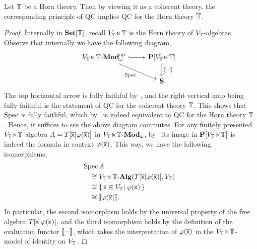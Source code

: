 \begin{theorem}\label{thm:qccohgeneraliseqchorn}
  Let $\mathbb{T}$ be a Horn theory. Then by viewing it as a coherent theory, the corresponding principle of \gls{QC} implies \gls{QC} for the Horn theory $\mathbb{T}$.
\end{theorem}
\begin{proof}
  Internally in $\mathbf{Set}[\mathbb{T}]$, recall $V_{\mathbb{T}}\hspace{-.4ex}\ltimes\hspace{-.4ex}\mathbb{T}$ is the Horn theory of $V_{\mathbb{T}}$-algebras. Observe that internally we have the following diagram,
  \[
  \begin{tikzcd}
    \mmod{\VT}_\omega\op \ar[dr, "\spec"'] \ar[r, hook] & \mb P[\VT] \ar[d, hook, "\ass-"] \\
    & \mb S
  \end{tikzcd}
  \]
  The top horizontal arrow is fully faithful by~, and the right vertical map being fully faithful is the statement of \gls{QC} for the coherent theory $\mathbb{T}$. This shows that $\operatorname{Spec}$ is fully faithful, which by~ is indeed equivalent to \gls{QC} for the Horn theory $\mathbb{T}$. Hence, it suffices to see the above diagram commutes. For any finitely presented $V_{\mathbb{T}}\hspace{-.4ex}\ltimes\hspace{-.4ex}\mathbb{T}$-algebra $A = T[\overline{\mathsf{x}}|\varphi(\overline{\mathsf{x}})]$ in $V_{\mathbb{T}}\hspace{-.4ex}\ltimes\hspace{-.4ex}\mathbb{T}\text{-}\mathbf{Mod}_\omega$, by~ its image in $\mathbf{P}[V_{\mathbb{T}}\hspace{-.4ex}\ltimes\hspace{-.4ex}\mathbb{T}]$ is indeed the formula in context $\varphi(\overline{\mathsf{x}})$. This way, we have the following isomorphisms,
  \begin{align*}
    &\operatorname{Spec} A \\
    &\quad\cong V_{\mathbb{T}}\hspace{-.4ex}\ltimes\hspace{-.4ex}\mathbb{T}\text{-}\mathbf{Alg}(T[\mathsf{\overline{x}}|\varphi(\overline{\mathsf{x}})],V_{\mathbb{T}}) \\
    &\quad\cong \left\{\,\overline{\mathsf{x}}\in V_{\mathbb{T}}\,\middle|\,\varphi(\overline{\mathsf{x}})\,\right\} \\
    &\quad\cong \llbracket\varphi(\overline{\mathsf{x}})\rrbracket.
  \end{align*}
  In particular, the second isomorphism holds by the universal property of the free algebra $T[\overline{\mathsf{x}}|\varphi(\overline{\mathsf{x}})]$, and the third isomorphism holds by the definition of the evaluation functor $\llbracket-\rrbracket$, which takes the interpretation of $\varphi(\overline{\mathsf{x}})$ in the $V_{\mathbb{T}}\hspace{-.4ex}\ltimes\hspace{-.4ex}\mathbb{T}$-model of identity on $V_{\mathbb{T}}$. 
\end{proof}

